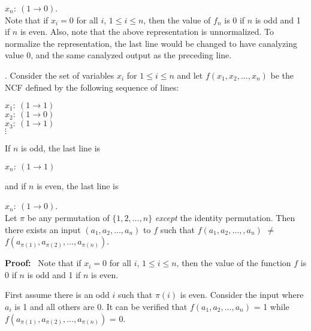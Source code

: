 \noindent
\hspace*{0.5in}
$x_n:~ (1 \rightarrow 0)$. \\

Note that if $x_i = 0$ for all $i$, $1 \leq i \leq n$, then the
value of $f_n$ is 0 if $n$ is odd and 1 if $n$ is even.  Also, note
that the above representation is unnormalized. To normalize the
representation, the last line would be changed to have canalyzing
value 0, and the same canalyzed output as the preceding line.






\iffalse
\begin{theorem}\label{thm:ncf_asymmetry}.
Consider the set of variables $x_i$ for $1 \leq i \leq n$ and 
let $f(x_1, x_2, \ldots, x_n)$ be the NCF defined by the following sequence
of lines:

\medskip
\noindent
\hspace*{0.5in}
$x_1:~ (1 \rightarrow 1)$ \\
\hspace*{0.5in}
$x_2:~ (1 \rightarrow 0)$ \\
\hspace*{0.5in}
$x_3:~ (1 \rightarrow 1)$ \\
\hspace*{0.75in}
$\vdots$ 

\noindent
If $n$ is odd, the last line is 

\noindent
\hspace*{0.5in}
$x_n:~ (1 \rightarrow 1)$ 

\noindent
and if $n$ is even, the last line is 

\noindent
\hspace*{0.5in}
$x_n:~ (1 \rightarrow 0)$. \\

\noindent
Let $\pi$ be any permutation of $\{1, 2, \ldots, n\}$
\emph{except} the identity permutation.
Then there exists an input $(a_1, a_2, \ldots,  a_n)$ 
to $f$ such that $f(a_1, a_2, \ldots, ,a_n)$ $\neq$  
$f(a_{\pi(1)}, a_{\pi(2)}, \ldots, a_{\pi(n)})$.
\end{theorem}

\noindent
\textbf{Proof:}~ 
Note that if $x_i = 0$ for all $i$, $1 \leq i \leq n$, then the
value of the function $f$ is 0 if $n$ is odd and 1 if $n$ is even.

First assume there is an odd $i$ such that $\pi(i)$ is even. 
Consider the input where $a_i$ is 1 and all others are 0. 
It can be verified that $f(a_1, a_2, \ldots, a_n)$ = 1 while
$f(a_{\pi(1)}, a_{\pi(2)}, \ldots, a_{\pi(n)})$ = 0.

